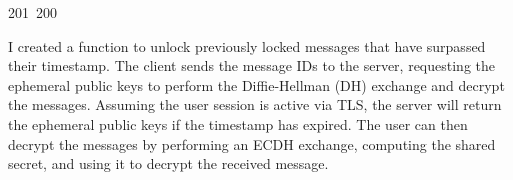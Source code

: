 201~200~\documentclass{article}
\begin{document}
	                                                                                                                                                                                                                                                                                                	                                                                                                                                        	    	                                                                                                	                                                                                                                        I created a function to unlock previously locked messages that have surpassed their timestamp. The client sends the message IDs to the server, requesting the ephemeral public keys to perform the Diffie-Hellman (DH) exchange and decrypt the messages. Assuming the user session is active via TLS, the server will return the ephemeral public keys if the timestamp has expired. The user can then decrypt the messages by performing an ECDH exchange, computing the shared secret, and using it to decrypt the received message.
\end{document}
